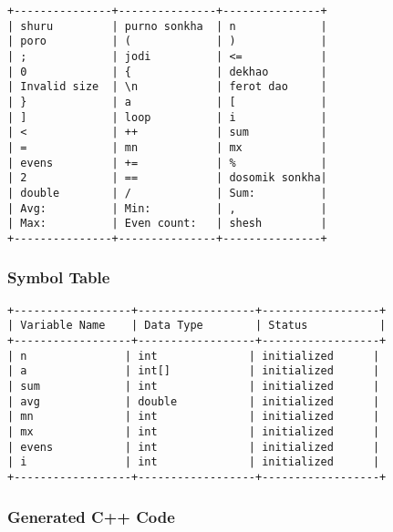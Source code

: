\documentclass[12pt,a4paper]{article}
\begin{document}
\begin{lstlisting}[caption=Output: output_tokens.txt]
+---------------+---------------+---------------+
| shuru         | purno sonkha  | n             |
| poro          | (             | )             |
| ;             | jodi          | <=            |
| 0             | {             | dekhao        |
| Invalid size  | \n            | ferot dao     |
| }             | a             | [             |
| ]             | loop          | i             |
| <             | ++            | sum           |
| =             | mn            | mx            |
| evens         | +=            | %             |
| 2             | ==            | dosomik sonkha|
| double        | /             | Sum:          |
| Avg:          | Min:          | ,             |
| Max:          | Even count:   | shesh         |
+---------------+---------------+---------------+
\end{lstlisting}

\subsubsection{Symbol Table}

\begin{lstlisting}[caption=Output: output_symbol_table.txt]
+------------------+------------------+------------------+
| Variable Name    | Data Type        | Status           |
+------------------+------------------+------------------+
| n               | int              | initialized      |
| a               | int[]            | initialized      |
| sum             | int              | initialized      |
| avg             | double           | initialized      |
| mn              | int              | initialized      |
| mx              | int              | initialized      |
| evens           | int              | initialized      |
| i               | int              | initialized      |
+------------------+------------------+------------------+
\end{lstlisting}

\subsubsection{Generated C++ Code}
\end{document}
